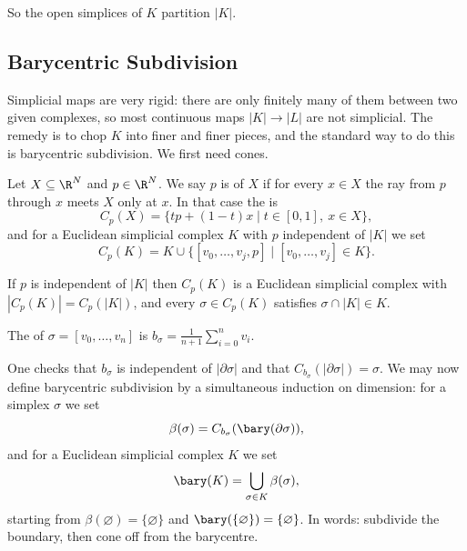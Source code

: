 So the open simplices of $K$ partition $|K|$.

\subsection{Barycentric Subdivision}

Simplicial maps are very rigid: there are only finitely many of them between two given
complexes, so most continuous maps $|K|\to|L|$ are not simplicial. The remedy is to chop
$K$ into finer and finer pieces, and the standard way to do this is barycentric
subdivision. We first need cones.

\begin{definition}
	Let $X \subseteq \R^N$ and $p \in \R^N$. We say $p$ is  of $X$ if for every $x \in X$ the ray from $p$ through $x$ meets $X$ only at $x$. In that case the  is
	$$
	C_p(X) = \{tp + (1-t)x \mid t \in [0,1],\ x \in X\},
	$$
	and for a Euclidean simplicial complex $K$ with $p$ independent of $|K|$ we set
	$$
	C_p(K) = K \cup \{[v_0,\dots,v_j,p] \mid [v_0,\dots,v_j]\in K\}.
	$$
\end{definition}

\begin{lemma} \label{lem:cone}
	If $p$ is independent of $|K|$ then $C_p(K)$ is a Euclidean simplicial complex with $|C_p(K)| = C_p(|K|)$, and every $\sigma \in C_p(K)$ satisfies $\sigma \cap |K| \in K$.
\end{lemma}

\begin{definition}[Barycentre]
	The  of $\sigma = [v_0,\dots,v_n]$ is $b_\sigma = \frac{1}{n+1}\sum_{i=0}^n v_i$.
\end{definition}

One checks that $b_\sigma$ is independent of $|\partial\sigma|$ and that
$C_{b_\sigma}(|\partial\sigma|) = \sigma$. We may now define barycentric subdivision by a
simultaneous induction on dimension: for a simplex $\sigma$ we set
$$
\beta(\sigma) = C_{b_\sigma}(\bary(\partial\sigma)),
$$
and for a Euclidean simplicial complex $K$ we set
$$
\bary(K) = \bigcup_{\sigma \in K}\beta(\sigma),
$$
starting from $\beta(\varnothing) = \{\varnothing\}$ and $\bary(\{\varnothing\}) = \{\varnothing\}$.
In words: subdivide the boundary, then cone off from the barycentre.

